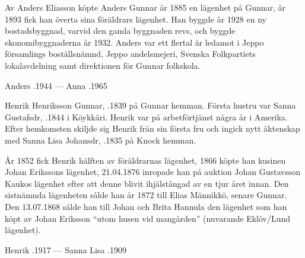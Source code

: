 Av Anders Eliasson köpte Anders Gunnar år 1885 en lägenhet på Gunnar, år 1893 fick han överta sina föräldrars lägenhet. Han byggde år 1928 en ny bostadsbyggnad, varvid den gamla byggnaden revs, och byggde ekonomibyggnaderna år 1932.	Anders var ett flertal år ledamot i Jeppo församlings boställsnämnd, Jeppo andelsmejeri, Svenska Folkpartiets lokalavdelning samt direktionen för Gunnar folkskola.

Anders .1944  ---  Anna .1965


%
Henrik Henriksson Gunnar, .1839 på Gunnar hemman. Första hustru var Sanna Gustafsdr, .1844 i Köykkäri. Henrik var på arbetförtjänst några år i Amerika. Efter hemkomsten skiljde sig Henrik från sin första fru och ingick nytt äktenskap med Sanna Lisa Johansdr, .1835 på Knock hemman.
\begin{jhchildren}
  \item {}
  \item {}
  \item {}
  \item {}
  \item {}
\end{jhchildren}

År 1852 fick Henrik hälften av föräldrarnas lägenhet, 1866 köpte han kusinen Johan Erikssons lägenhet, 21.04.1876 inropade han på auktion Johan Gustavsson Kaukos lägenhet efter att denne blivit ihjälstångad av en tjur året innan. Den sistnämnda lägenheten sålde han år 1872 till Elias Männikkö, senare Gunnar. Den 13.07.1868 sålde han till Johan och Brita Hannula den lägenhet som han köpt av Johan Eriksson ``utom	husen vid mangården'' (nuvarande Eklöv/Lund lägenhet).

Henrik .1917  ---  Sanna Lisa .1909


